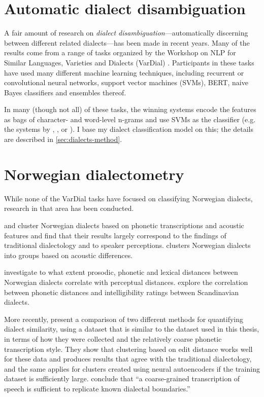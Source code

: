 \section{Automatic dialect disambiguation}
\label{sec:dialects-dialectometry}

A fair amount of research on \textit{dialect disambiguation}---automatically discerning between different related dialects---has been made in recent years.
Many of the results come from a range of tasks organized by the Workshop on NLP for Similar Languages, Varieties and Dialects (VarDial)  \citep{zampieri2017vardial1,zampieri2018vardial2,zampieri2019vardial3,gaman2020vardial4,chakravarthi2021vardial5}.
Participants in these tasks have used many different machine learning techniques, including recurrent or convolutional neural networks, support vector machines (SVMs), BERT, naive Bayes classifiers and ensembles thereof.

In many (though not all) of these tasks, the winning systems encode the features as bags of character- and word-level n-grams and use SVMs as the classifier (e.g. the systems by \citet{malmasi2017vardial}, \citet{bestgen2017vardial}, \citet{coltekin2018vardial} or \citet{coltekin2020vardial}).
I base my dialect classification model on this; the details are described in \autoref{sec:dialects-method}.

\section{Norwegian dialectometry}
\label{sec:norwegian-dialectometry}

While none of the VarDial tasks have focused on classifying Norwegian dialects, research in that area has been conducted.

\citet{heeringa2003norwegian} and \citet{heeringa2009measuring} cluster Norwegian dialects based on phonetic transcriptions and acoustic features and find that their results largely correspond to the findings of traditional dialectology and to speaker perceptions.
\citet[pp.~199--211]{heeringa2004measuring} clusters Norwegian dialects into groups based on acoustic differences.

\citet{gooskens2006relative} investigate to what extent prosodic, phonetic and lexical distances between Norwegian dialects correlate with perceptual distances.
\citet{beijering2008predicting} explore the correlation between phonetic distances and intelligibility ratings between Scandinavian dialects.

More recently, \cite{kaasen2020comparing} present a comparison of two different methods for quantifying dialect similarity, using a dataset that is similar to the dataset used in this thesis, in terms of how they were collected and the relatively coarse phonetic transcription style.
They show that clustering based on edit distance works well for these data and produces results that agree with the traditional dialectology, and the same applies for clusters created using neural autoencoders if the training dataset is sufficiently large.
\citeauthor{kaasen2020comparing} conclude that ``a coarse-grained transcription of
speech is sufficient to replicate known dialectal boundaries.''
